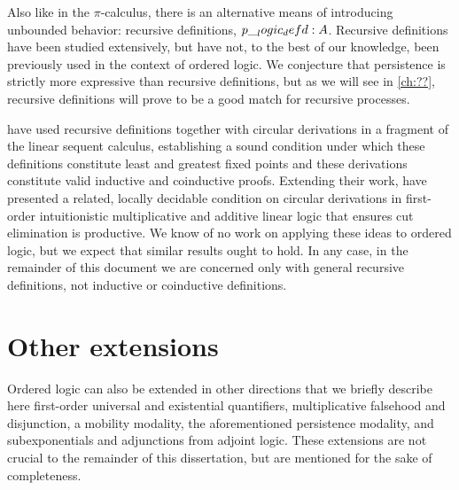 Also like in the $\pi$-calculus, there is an alternative means of introducing unbounded behavior: recursive definitions, $p \__logic_defd: A$.
Recursive definitions have been studied extensively\autocites{??}, but have not, to the best of our knowledge, been previously used in the context of ordered logic.
We conjecture that persistence is strictly more expressive than recursive definitions, but as we will see in \cref{ch:??}, recursive definitions will prove to be a good match for recursive processes.

\Textcite{Fortier+Santocanale:CSL13} have used recursive definitions together with circular derivations in a fragment of the linear sequent calculus, establishing a sound condition under which these definitions constitute least and greatest fixed points and these derivations constitute valid inductive and coinductive proofs.
Extending their work, \textcite{Derakhshan+Pfenning:??} have presented a related, locally decidable condition on circular derivations in first-order intuitionistic multiplicative and additive linear logic that ensures cut elimination is productive.
We know of no work on applying these ideas to ordered logic, but we expect that similar results ought to hold.
In any case, in the remainder of this document we are concerned only with general recursive definitions, not inductive or coinductive definitions.

\section{Other extensions}\label{sec:ordered-logic:extensions}

Ordered logic can also be extended in other directions that we briefly describe here
first-order universal and existential quantifiers,
 multiplicative falsehood and disjunction\autocite{Chang+:CMU03},
 a mobility modality\autocite{Polakow+Pfenning:MFPS99},
 the aforementioned persistence modality, and
 subexponentials\autocite{Kanovich+:MSCS19} and adjunctions from adjoint logic\autocite{??}.
These extensions are not crucial to the remainder of this dissertation, but are mentioned for the sake of completeness.


